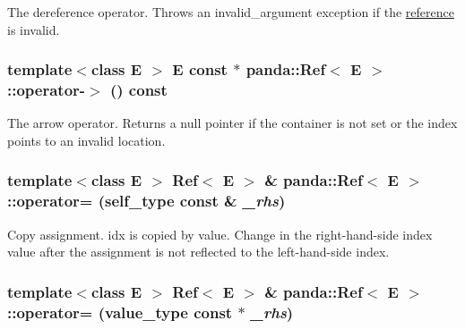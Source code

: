The dereference operator. Throws an invalid\_\-argument exception if the \hyperlink{namespacepanda_1_1reference}{reference} is invalid. \hypertarget{classpanda_1_1Ref_a5545faf85a2d31f3edf3fd2205ba1e40}{
\subsubsection[{operator-\/$>$}]{\setlength{\rightskip}{0pt plus 5cm}template$<$class E $>$ E const $\ast$ {\bf panda::Ref}$<$ E $>$::operator-\/$>$ () const}}
\label{classpanda_1_1Ref_a5545faf85a2d31f3edf3fd2205ba1e40}


The arrow operator. Returns a null pointer if the container is not set or the index points to an invalid location. \hypertarget{classpanda_1_1Ref_a5d4fbf20bb02e812ab035499aef85240}{
\subsubsection[{operator=}]{\setlength{\rightskip}{0pt plus 5cm}template$<$class E $>$ {\bf Ref}$<$ E $>$ \& {\bf panda::Ref}$<$ E $>$::operator= ({\bf self\_\-type} const \& {\em \_\-rhs})}}
\label{classpanda_1_1Ref_a5d4fbf20bb02e812ab035499aef85240}


Copy assignment. idx is copied by value. Change in the right-\/hand-\/side index value after the assignment is not reflected to the left-\/hand-\/side index. \hypertarget{classpanda_1_1Ref_a76aa1d8abb4d45935c3b3b75bb50d161}{
\subsubsection[{operator=}]{\setlength{\rightskip}{0pt plus 5cm}template$<$class E $>$ {\bf Ref}$<$ E $>$ \& {\bf panda::Ref}$<$ E $>$::operator= ({\bf value\_\-type} const $\ast$ {\em \_\-rhs})}}
\label{classpanda_1_1Ref_a76aa1d8abb4d45935c3b3b75bb50d161}


